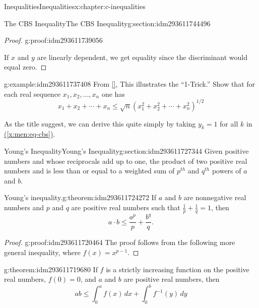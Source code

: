 \documentclass[twoside,10pt,]{book}
\newcommand{\xreffont}{\relax}
\numberwithin{equation}{section}
\begin{document}
\begin{chapterptx}{Inequalities}{}{Inequalities}{}{}{x:chapter:c-inequalities}
\begin{sectionptx}{The CBS Inequality}{}{The CBS Inequality}{}{}{g:section:idm293611744496}
\begin{proof}{}{g:proof:idm293611739056}
\par
If  \(x\) and \(y\) are linearly dependent, we get equality since the discriminant would equal zero.%
\end{proof}
\begin{example}{}{g:example:idm293611737408}%
From \hyperlink{x:biblio:biblio-steele-2004}{[{\xreffont 15}]}, This illustrates the ``1-Trick.''  Show that for each real sequence \(x_1, x_2, \dots, x_n\) one has%
\begin{equation*}
x_1 + x_2 + \cdots + x_n \leq \sqrt{n} \left(x_1^2 + x_2^2 + \cdots + x_n^2\right)^{1/2} 
\end{equation*}
%
\par
As the title suggest, we can derive this quite simply by taking \(y_k = 1\) for all \(k\) in \hyperref[x:men:eq-cbs]{({\xreffont\ref{x:men:eq-cbs}})}.%
\end{example}
\end{sectionptx}
%
%
\typeout{************************************************}
\typeout{************************************************}
%
\begin{sectionptx}{Young's Inequality}{}{Young's Inequality}{}{}{g:section:idm293611727344}
Given positive numbers  and  whose reciprocals add up to one, the product  of two positive real numbers  and  is less than or equal to a weighted sum of \(p^{th}\) and \(q^{th}\) powers  of \(a\) and \(b\).%
\begin{theorem}{Young's inequality.}{}{g:theorem:idm293611724272}%
%
If \(a\) and \(b\) are nonnegative real numbers and \(p\) and \(q\) are positive real numbers such that \(\frac{1}{p} + \frac{1}{q} = 1\), then%
\begin{equation*}
a\cdot b \leq \frac{a^{p}}{p} + \frac{b^{q}}{q}.
\end{equation*}
%
\end{theorem}
\begin{proof}{}{g:proof:idm293611720464}
The proof follows from the following more general inequality, where \(f(x)=x^{p-1}\).%
\end{proof}
\begin{theorem}{}{}{g:theorem:idm293611719680}%
If \(f\) is a strictly increasing function on the positive real numbers, \(f(0)=0\), and \(a\) and \(b\) are positive real numbers, then%
\begin{equation*}
a b \leq \int_0^a f(x) \, dx +\int_0^b f^{-1}(y) \, dy
\end{equation*}
%
\end{theorem}

\end{sectionptx}
\end{chapterptx}
\end{document}
